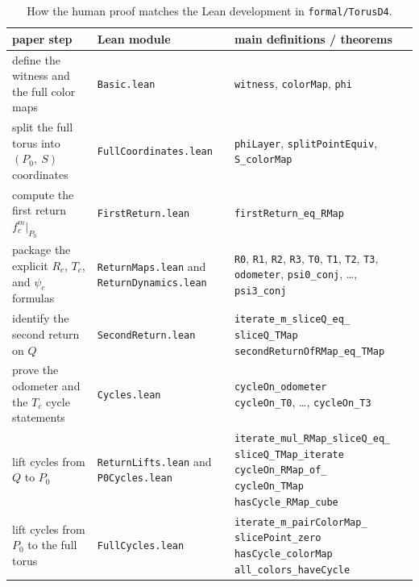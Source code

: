 \documentclass[11pt]{article}
\newcommand{\Pzero}{P_0}
\newcommand{\Qslice}{Q}
\begin{document}
\begin{table}[t]
\centering
\scriptsize
\setlength{\tabcolsep}{4pt}
\begin{tabularx}{\textwidth}{@{}l>{\raggedright\arraybackslash}X>{\raggedright\arraybackslash}X@{}}
\toprule
paper step & Lean module & main definitions / theorems \\
\midrule
define the witness and the full color maps & \texttt{Basic.lean} & \texttt{witness}, \texttt{colorMap}, \texttt{phi} \\
split the full torus into $(\Pzero,\ S)$ coordinates & \texttt{FullCoordinates.lean} & \texttt{phiLayer}, \texttt{splitPointEquiv}, \texttt{S\_colorMap} \\
compute the first return $f_c^m|_{\Pzero}$ & \texttt{FirstReturn.lean} & \texttt{firstReturn\_eq\_RMap} \\
package the explicit $R_c$, $T_c$, and $\psi_c$ formulas & \texttt{ReturnMaps.lean} and \texttt{ReturnDynamics.lean} & \texttt{R0}, \texttt{R1}, \texttt{R2}, \texttt{R3}, \texttt{T0}, \texttt{T1}, \texttt{T2}, \texttt{T3}, \texttt{odometer}, \texttt{psi0\_conj}, \dots, \texttt{psi3\_conj} \\
identify the second return on $\Qslice$ & \texttt{SecondReturn.lean} & \shortstack[l]{\texttt{iterate\_m\_sliceQ\_eq\_} \\ \texttt{sliceQ\_TMap} \\ \texttt{secondReturnOfRMap\_eq\_TMap}} \\
prove the odometer and the $T_c$ cycle statements & \texttt{Cycles.lean} & \shortstack[l]{\texttt{cycleOn\_odometer} \\ \texttt{cycleOn\_T0}, \dots, \texttt{cycleOn\_T3}} \\
lift cycles from $\Qslice$ to $\Pzero$ & \texttt{ReturnLifts.lean} and \texttt{P0Cycles.lean} & \shortstack[l]{\texttt{iterate\_mul\_RMap\_sliceQ\_eq\_} \\ \texttt{sliceQ\_TMap\_iterate} \\ \texttt{cycleOn\_RMap\_of\_} \\ \texttt{cycleOn\_TMap} \\ \texttt{hasCycle\_RMap\_cube}} \\
lift cycles from $\Pzero$ to the full torus & \texttt{FullCycles.lean} & \shortstack[l]{\texttt{iterate\_m\_pairColorMap\_} \\ \texttt{slicePoint\_zero} \\ \texttt{hasCycle\_colorMap} \\ \texttt{all\_colors\_haveCycle}} \\
\bottomrule
\end{tabularx}
\caption{How the human proof matches the Lean development in \texttt{formal/TorusD4}.}
\label{tab:lean-map}
\end{table}
\end{document}
